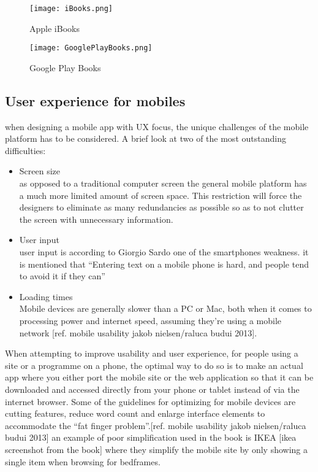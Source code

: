 \begin{figure}[h!]
\centering
\texttt{[image: iBooks.png]}
\caption{Apple iBooks}
\end{figure}

\begin{figure}[h!]
\centering
\texttt{[image: GooglePlayBooks.png]}
\caption{Google Play Books}
\end{figure}
\subsection{User experience for mobiles}
when designing a mobile app with UX focus, the unique challenges of the mobile platform has to be considered. A brief look at two of the most outstanding difficulties:
\begin{itemize}
\item Screen size\\
as opposed to a traditional computer screen the general mobile platform has a much more limited amount of screen space. This restriction will force the designers to eliminate as many redundancies as possible so as to not clutter the screen with unnecessary information. \cite{Sardo}
\item User input\\
user input is according to Giorgio Sardo one of  the smartphones weakness. it is mentioned that “Entering text on a mobile phone is hard, and people tend to avoid it if they can”\cite{Sardo}
\item Loading times\\
Mobile devices are generally slower than a PC or Mac, both when it comes to processing power and internet speed, assuming they’re using a mobile network [ref. mobile usability jakob nielsen/raluca budui 2013]. 
\end{itemize}
When attempting to improve usability and user experience, for people using a site or a programme on a phone, the optimal way to do so is to make an actual app where you either port the mobile site or the web application so that it can be downloaded and accessed directly from your phone or tablet instead of via the internet browser. 
Some of the guidelines for optimizing for mobile devices are cutting features, reduce word count and enlarge interface elements to accommodate the “fat finger problem”.[ref. mobile usability jakob nielsen/raluca budui 2013] an example of poor simplification used in the book is IKEA [ikea screenshot from the book] where they simplify the mobile site by only showing a single item when browsing for bedframes.
